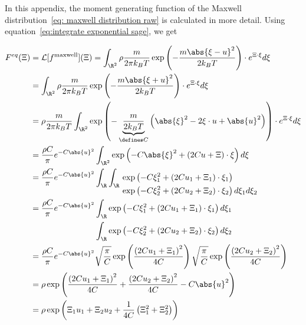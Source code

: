 In this appendix, the moment generating function of the Maxwell distribution~\eqref{eq: maxwell distribution raw} is calculated in more detail.
Using equation~\eqref{eq:integrate exponential sage}, we get

\begin{equation}
  \begin{aligned}
    F^{eq}(\Xi) & = \mathcal{L}[f^{\text{maxwell}}](\Xi)
    = \int_{\R^2} \rho \frac{m}{2\pi k_B T} \exp \left( - \frac{m\abs{\xi-u}^2}{2 k_B T}\right) \cdot e^{\Xi\cdot\xi} d\xi \\
    & = \int_{\R^2} \rho \frac{m}{2\pi k_B T} \exp \left( - \frac{m\abs{\xi+u}^2}{2 k_B T}\right) \cdot e^{\Xi\cdot\xi} d\xi \\
    & = \rho  \frac{m}{2\pi k_B T} \int_{\R^2}
      \exp \left( - \underbrace{\frac{m}{2 k_B T}}_{\defines C} \left( \abs{\xi}^2 - 2\xi\cdot u + \abs{u}^2 \right)\right) \cdot e^{\Xi\cdot\xi} d\xi \\
    & = \frac{\rho C} {\pi} e^{-C \abs{u}^2}
      \int_{\R^2}
      \exp \left( - C\abs{\xi}^2 + (2Cu + \Xi)\cdot\xi \right) d\xi \\
    & =  \frac{\rho C} {\pi} e^{-C \abs{u}^2}
      \int_{\R} \int_{\R}
      \begin{aligned}[t]
      &\exp \left( - C \xi_1^2 + (2Cu_1 + \Xi_1)\cdot\xi_1 \right) \\
      &\exp \left( - C\xi_2^2 + (2Cu_2 + \Xi_2)\cdot\xi_2 \right) d\xi_1 d\xi_2
      \end{aligned}\\
    & = \frac{\rho C} {\pi} e^{-C \abs{u}^2}
      \begin{aligned}[t]
        &\int_{\R}
        \exp \left( - C\xi_1^2 + (2Cu_1 + \Xi_1)\cdot\xi_1 \right) d\xi_1 \\
        &\int_{\R}
        \exp \left( - C\xi_2^2 + (2Cu_2 + \Xi_2)\cdot\xi_2 \right) d\xi_2
      \end{aligned}\\
    & = \frac{\rho C} {\pi} e^{-C \abs{u}^2}
      \sqrt{\frac{\pi}{C}}\exp \left( \frac{{(2Cu_1 + \Xi_1)}^2}{4C}\right)
      \sqrt{\frac{\pi}{C}}\exp \left( \frac{{(2Cu_2 + \Xi_2)}^2}{4C}\right) \\
    & = \rho
      \exp \left( \frac{{(2Cu_1 + \Xi_1)}^2}{4C} + \frac{{(2Cu_2 + \Xi_2)}^2}{4C} -C \abs{u}^2 \right) \\
    & = \rho
      \exp \left( \Xi_1 u_1 + \Xi_2 u_2 + \frac{1}{4C}\left(\Xi_1^2 + \Xi_2^2 \right)\right)
  \end{aligned}
\end{equation}
